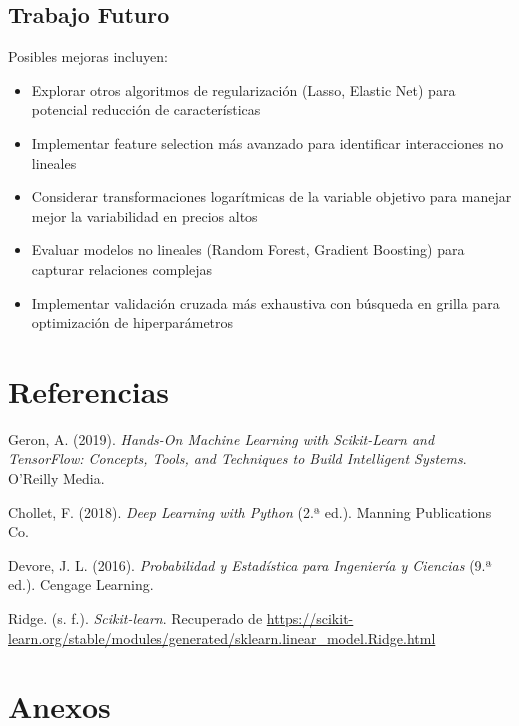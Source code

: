 \documentclass[11pt,a4paper]{article}
\begin{document}
\subsection{Trabajo Futuro}

Posibles mejoras incluyen:
\begin{itemize}
    \item Explorar otros algoritmos de regularización (Lasso, Elastic Net) para potencial reducción de características
    \item Implementar feature selection más avanzado para identificar interacciones no lineales
    \item Considerar transformaciones logarítmicas de la variable objetivo para manejar mejor la variabilidad en precios altos
    \item Evaluar modelos no lineales (Random Forest, Gradient Boosting) para capturar relaciones complejas
    \item Implementar validación cruzada más exhaustiva con búsqueda en grilla para optimización de hiperparámetros
\end{itemize}

\section{Referencias}

\begin{thebibliography}{9}

    Geron, A. (2019). \textit{Hands-On Machine Learning with Scikit-Learn and TensorFlow: Concepts, Tools, and Techniques to Build Intelligent Systems}. O'Reilly Media.

    Chollet, F. (2018). \textit{Deep Learning with Python} (2.ª ed.). Manning Publications Co.
    
    Devore, J. L. (2016). \textit{Probabilidad y Estadística para Ingeniería y Ciencias} (9.ª ed.). Cengage Learning.

    Ridge. (s. f.). \textit{Scikit-learn}. Recuperado de 
    \url{https://scikit-learn.org/stable/modules/generated/sklearn.linear_model.Ridge.html}
    

\end{thebibliography}

\section{Anexos}
\end{document}
